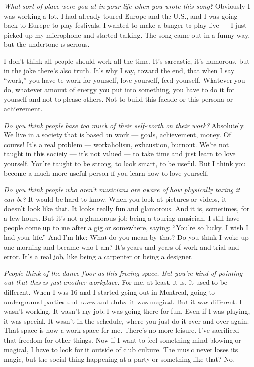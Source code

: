 \emph{What sort of place were you at in your life when you wrote this
song?} Obviously I was working a lot. I had already toured Europe and
the U.S., and I was going back to Europe to play festivals. I wanted to
make a banger to play live --- I just picked up my microphone and
started talking. The song came out in a funny way, but the undertone is
serious.

I don't think all people should work all the time. It's sarcastic, it's
humorous, but in the joke there's also truth. It's why I say, toward the
end, that when I say ``work,'' you have to work for yourself, love
yourself, feed yourself. Whatever you do, whatever amount of energy you
put into something, you have to do it for yourself and not to please
others. Not to build this facade or this persona or achievement.

\emph{Do you think people base too much of their self-worth on their
work?} Absolutely. We live in a society that is based on work --- goals,
achievement, money. Of course! It's a real problem --- workaholism,
exhaustion, burnout. We're not taught in this society --- it's not
valued --- to take time and just learn to love yourself. You're taught
to be strong, to look smart, to be useful. But I think you become a much
more useful person if you learn how to love yourself.

\emph{Do you think people who aren't musicians are aware of how
physically taxing it can be?} It would be hard to know. When you look at
pictures or videos, it doesn't look like that. It looks really fun and
glamorous. And it is, sometimes, for a few hours. But it's not a
glamorous job being a touring musician. I still have people come up to
me after a gig or somewhere, saying: ``You're so lucky. I wish I had
your life.'' And I'm like: What do you mean by that? Do you think I woke
up one morning and became who I am? It's years and years of work and
trial and error. It's a real job, like being a carpenter or being a
designer.

\emph{People think of the dance floor as this freeing space. But you're
kind of pointing out that this is just another workplace.} For me, at
least, it is. It used to be different. When I was 16 and I started going
out in Montreal, going to underground parties and raves and clubs, it
was magical. But it was different: I wasn't working. It wasn't my job. I
was going there for fun. Even if I was playing, it was special. It
wasn't in the schedule, where you just do it over and over again. That
space is now a work space for me. There's no more leisure. I've
sacrificed that freedom for other things. Now if I want to feel
something mind-blowing or magical, I have to look for it outside of club
culture. The music never loses its magic, but the social thing happening
at a party or something like that? No.

